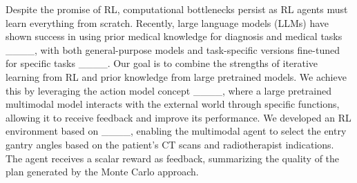 Despite the promise of RL, computational bottlenecks persist as RL agents must learn everything from scratch. Recently, large language models (LLMs) have shown success in using prior medical knowledge for diagnosis and medical tasks ____, with both general-purpose models and task-specific versions fine-tuned for specific tasks ____. Our goal is to combine the strengths of iterative learning from RL and prior knowledge from large pretrained models. We achieve this by leveraging the action model concept ____, where a large pretrained multimodal model interacts with the external world through specific functions, allowing it to receive feedback and improve its performance. We developed an RL environment based on ____, enabling the multimodal agent to select the entry gantry angles based on the patient's CT scans and radiotherapist indications. The agent receives a scalar reward as feedback, summarizing the quality of the plan generated by the Monte Carlo approach.

\vspace{-2mm}